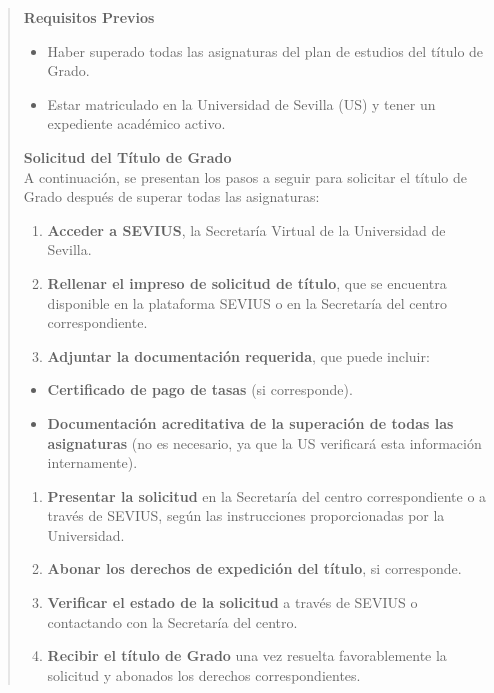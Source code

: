 \documentclass[12pt,a4paper,oneside]{report}
\begin{document}
\begin{itemize}
\begin{itemize}
\begin{quote}
\noindent\textbf{Requisitos Previos}\\

\begin{itemize}
  \item Haber superado todas las asignaturas del plan de estudios del título de Grado.
  \item Estar matriculado en la Universidad de Sevilla (US) y tener un expediente académico activo.
\end{itemize}


\noindent\textbf{Solicitud del Título de Grado}\\

A continuación, se presentan los pasos a seguir para solicitar el título de Grado después de superar todas las asignaturas:

\begin{enumerate}
  \item \textbf{Acceder a SEVIUS}, la Secretaría Virtual de la Universidad de Sevilla.
  \item \textbf{Rellenar el impreso de solicitud de título}, que se encuentra disponible en la plataforma SEVIUS o en la Secretaría del centro correspondiente.
  \item \textbf{Adjuntar la documentación requerida}, que puede incluir:
\end{enumerate}
\begin{itemize}
  \item \textbf{Certificado de pago de tasas} (si corresponde).
  \item \textbf{Documentación acreditativa de la superación de todas las asignaturas} (no es necesario, ya que la US verificará esta información internamente).
\end{itemize}
\begin{enumerate}
  \item \textbf{Presentar la solicitud} en la Secretaría del centro correspondiente o a través de SEVIUS, según las instrucciones proporcionadas por la Universidad.
  \item \textbf{Abonar los derechos de expedición del título}, si corresponde.
  \item \textbf{Verificar el estado de la solicitud} a través de SEVIUS o contactando con la Secretaría del centro.
  \item \textbf{Recibir el título de Grado} una vez resuelta favorablemente la solicitud y abonados los derechos correspondientes.
\end{enumerate}



\end{quote}
\end{itemize}
\end{itemize}
\end{document}
